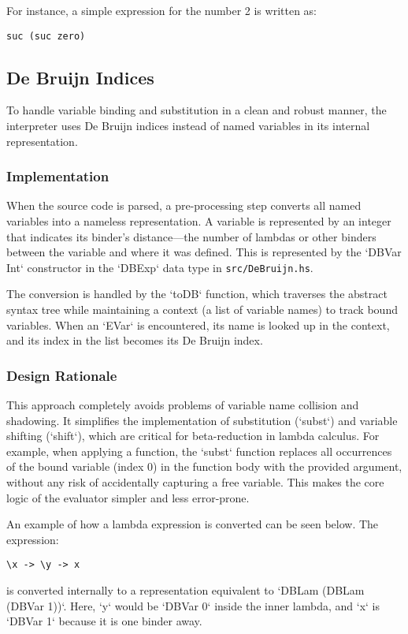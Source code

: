 For instance, a simple expression for the number 2 is written as:
\begin{verbatim}
suc (suc zero)
\end{verbatim}

\subsection{De Bruijn Indices}

To handle variable binding and substitution in a clean and robust manner, the interpreter uses De Bruijn indices instead of named variables in its internal representation.

\subsubsection{Implementation}
When the source code is parsed, a pre-processing step converts all named variables into a nameless representation. A variable is represented by an integer that indicates its binder's distance---the number of lambdas or other binders between the variable and where it was defined. This is represented by the `DBVar Int` constructor in the `DBExp` data type in \texttt{src/DeBruijn.hs}.

The conversion is handled by the `toDB` function, which traverses the abstract syntax tree while maintaining a context (a list of variable names) to track bound variables. When an `EVar` is encountered, its name is looked up in the context, and its index in the list becomes its De Bruijn index.

\subsubsection{Design Rationale}
This approach completely avoids problems of variable name collision and shadowing. It simplifies the implementation of substitution (`subst`) and variable shifting (`shift`), which are critical for beta-reduction in lambda calculus. For example, when applying a function, the `subst` function replaces all occurrences of the bound variable (index 0) in the function body with the provided argument, without any risk of accidentally capturing a free variable. This makes the core logic of the evaluator simpler and less error-prone.

An example of how a lambda expression is converted can be seen below. The expression:
\begin{verbatim}
\x -> \y -> x
\end{verbatim}
is converted internally to a representation equivalent to `DBLam (DBLam (DBVar 1))`. Here, `y` would be `DBVar 0` inside the inner lambda, and `x` is `DBVar 1` because it is one binder away.

